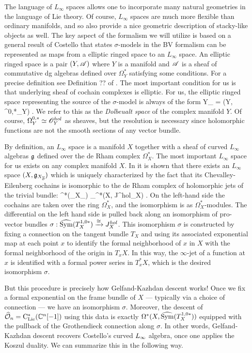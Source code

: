 The language of $L_\infty$ spaces allows one to incorporate many natural geometries in the language of Lie theory.
Of course, $L_\infty$ spaces are much more flexible than ordinary manifolds, and so also provide a nice geometric description of stacky-like objects as well.
The key aspect of the formalism we will utilize is based on a general result of Costello \cite{CostelloHolomorphic, WG2} that states $\sigma$-models in the BV formalism can be represented as maps from a elliptic ringed space to an $L_\infty$ space.
An elliptic ringed space is a pair $(Y, \mathscr A)$ where $Y$ is a manifold and $\mathscr A$ is a sheaf of commutative dg algebras defined over $\Omega^*_Y$ satisfying some conditions. 
For a precise definition see Definition ?? of \cite{CostelloHolomorphic}.
The most important condition for us is that underlying sheaf of cochain complexes is elliptic.
For us, the elliptic ringed space representing the source of the $\sigma$-model is always of the form
\ben
Y_{\dbar} = (Y, \Omega^{0,*}_Y) .
\een
We refer to this as the {\em Dolbeualt space} of the complex manifold $Y$. 
Of course, $\Omega^{0,*}_Y \simeq \mathscr O^{hol}_Y$ as sheaves, but the resolution is necessary since holomorphic functions are not the smooth sections of any vector bundle. 

By definition, an $L_\infty$ space is a manifold $X$ together with a sheaf of curved $L_\infty$ algebras $\mathfrak g$ defined over the de Rham complex $\Omega^*_X$. 
The most important $L_\infty$ space for us exists on any complex manifold $X$. 
In \cite{WG2} it is shown that there exists an $L_\infty$ space $(X, \mathfrak g_{X_{\overline{\partial}}})$ which is uniquely characterized by the fact that its Chevalley-Eilenberg cochains is isomorphic to the de Rham complex of holomorphic jets of the trivial bundle:
\ben
\clie^*(\fg_{X_{\dbar}}) \cong_\sigma \Omega^*(X, J^{hol}_X) .
\een
On the left-hand side the cochains are taken over the ring $\Omega^*_X$, and the isomorphism is as $\Omega^*_X$-modules.
The differential on the left hand side is pulled back along an isomorphism of pro-vector bundles 
$\sigma: \widehat{{\rm Sym}}(T^{1,0*}_X) \xrightarrow{\cong} J^{hol}_X$.
This isomorphism $\sigma$ is constructed by fixing a connection on the tangent bundle $T_X$
and using its associated exponential map at each point $x$ 
to identify the formal neighborhood of $x$ in $X$ with the formal neighborhood of the origin in $T_x X$.
In this way, the $\infty$-jet of a function at $x$ is identified with a formal power series in $T_x^* X$,
which is the desired isomorphism $\sigma$.

But this procedure is precisely how Gelfand-Kazhdan descent works! 
Once we fix a formal exponential on the frame bundle of $X$ --- typically via a choice of connection --- we have an isomorphism $\sigma$.
Moreover, the descent of $\widehat{\mathcal O}_n = {\rm C}_{{\rm Lie}}^*(\mathbb C^n[-1])$ using this data is exactly $\Omega^*(X, \widehat{{\rm Sym}}(T^{1,0*}_X))$
equipped with the pullback of the Grothendieck connection along $\sigma$.
In other words, Gelfand-Kazhdan descent recovers Costello's curved $\L8$ algebra,
once one applies the Koszul duality.
We can summarize this in the following way.

